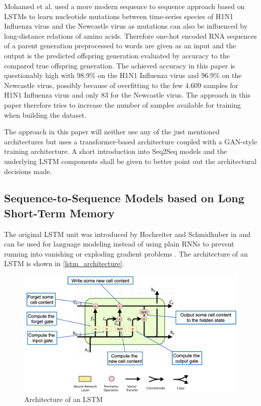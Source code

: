 Mohamed et al. \cite{Mohamed2021} used a more modern sequence to sequence approach based on \acp{LSTM} to learn nucleotide mutations between time-series species of H1N1 Influenza virus and the Newcastle virus as mutations can also be influenced by long-distance relations of amino acids. Therefore one-hot encoded \ac{RNA} sequences of a parent generation preprocessed to words are given as an input and the output is the predicted offspring generation evaluated by accuracy to the compared true offspring generation. The achieved accuracy in this paper is questionably high with 98.9\% on the H1N1 Influenza virus and 96.9\% on the Newcastle virus, possibly because of overfitting to the few 4.609 samples for H1N1 Influenza virus and only 83 for the Newcastle virus. The approach in this paper therefore tries to increase the number of samples available for training when building the dataset. 

\vspace{0.5cm}
The approach in this paper will neither use any of the just mentioned architectures but uses a transformer-based architecture coupled with a \ac{GAN}-style training architecture. A short introduction into \ac{Seq2Seq} models and the underlying \ac{LSTM} components shall be given to better point out the architectural decisions made. 

\subsection{Sequence-to-Sequence Models based on Long Short-Term Memory} \label{fundamentalsF}

The original \ac{LSTM} unit was introduced by Hochreiter and Schmidhuber in \cite{Hochreiter1997} and can be used for language modeling instead of using plain \acp{RNN} to prevent running into vanishing or exploding gradient problems \cite{Sundermeyer2012}. The architecture of an \ac{LSTM} is shown in \autoref{lstm_architecture}.

\begin{figure}[ht]
	\centering
	\includegraphics[width=\linewidth]{figures/lstm_architecture.png}
	\caption{Architecture of an \ac{LSTM} \cite{Gertz2020}}
	\label{lstm_architecture}
\end{figure}

